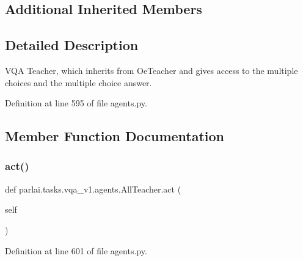 \subsection*{Additional Inherited Members}


\subsection{Detailed Description}
\begin{DoxyVerb}VQA Teacher, which inherits from OeTeacher and gives access to the multiple choices
and the multiple choice answer.
\end{DoxyVerb}
 

Definition at line 595 of file agents.\+py.



\subsection{Member Function Documentation}
\mbox{\label{classparlai_1_1tasks_1_1vqa__v1_1_1agents_1_1AllTeacher_af1d9fbd6919aba788a5c76f3fbe59957}} 
\subsubsection{\texorpdfstring{act()}{act()}}
{\footnotesize\ttfamily def parlai.\+tasks.\+vqa\+\_\+v1.\+agents.\+All\+Teacher.\+act (\begin{DoxyParamCaption}\item[{}]{self }\end{DoxyParamCaption})}



Definition at line 601 of file agents.\+py.


